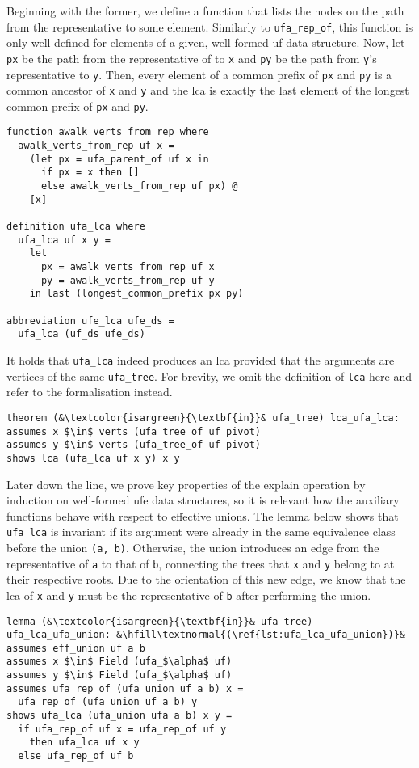 \documentclass[
  sigplan,
  10pt,
  anonymous,
  review,
  ]{acmart}
\newcommand{\opexplain}{explain}
\begin{document}
Beginning with the former, we define a function that lists the nodes on the path from the representative to some element.
Similarly to \lstinline|ufa_rep_of|, this function is only well-defined for elements of a given, well-formed \acrshort{uf} data structure.
Now, let \lstinline|px| be the path from the representative of to \lstinline|x| and \lstinline|py| be the path from \lstinline|y|'s representative to \lstinline|y|.
Then, every element of a common prefix of \lstinline|px| and \lstinline|py| is a common ancestor of \lstinline|x| and \lstinline|y| and
the \acrshort{lca} is exactly the last element of the longest common prefix of \lstinline|px| and \lstinline|py|. 
\begin{lstlisting}
function awalk_verts_from_rep where
  awalk_verts_from_rep uf x =
    (let px = ufa_parent_of uf x in
      if px = x then [] 
      else awalk_verts_from_rep uf px) @ 
    [x]

definition ufa_lca where
  ufa_lca uf x y =
    let
      px = awalk_verts_from_rep uf x
      py = awalk_verts_from_rep uf y
    in last (longest_common_prefix px py)

abbreviation ufe_lca ufe_ds =
  ufa_lca (uf_ds ufe_ds)
\end{lstlisting}
It holds that \lstinline|ufa_lca| indeed produces an \acrshort{lca} provided that the arguments are vertices of the same \lstinline|ufa_tree|.
For brevity, we omit the definition of \lstinline|lca| here and refer to the formalisation instead.
\begin{lstlisting}
theorem (&\textcolor{isargreen}{\textbf{in}}& ufa_tree) lca_ufa_lca:
assumes x $\in$ verts (ufa_tree_of uf pivot)
assumes y $\in$ verts (ufa_tree_of uf pivot)
shows lca (ufa_lca uf x y) x y
\end{lstlisting}
Later down the line, we prove key properties of the \opexplain{} operation by induction on well-formed \acrshort{ufe} data structures, so it is relevant how the auxiliary functions behave with respect to effective unions.
The lemma below shows that \lstinline|ufa_lca| is invariant if its argument were already in the same equivalence class before the union \lstinline|(a, b)|.
Otherwise, the union introduces an edge from the representative of \lstinline|a| to that of \lstinline|b|, connecting the trees that \lstinline|x| and \lstinline|y| belong to at their respective roots.
Due to the orientation of this new edge, we know that the \acrshort{lca} of \lstinline|x| and \lstinline|y| must be the representative of \lstinline|b| after performing the union.
\begin{lstlisting}[caption={[empty]}, label={lst:ufa_lca_ufa_union}]
lemma (&\textcolor{isargreen}{\textbf{in}}& ufa_tree) ufa_lca_ufa_union: &\hfill\textnormal{(\ref{lst:ufa_lca_ufa_union})}&
assumes eff_union uf a b
assumes x $\in$ Field (ufa_$\alpha$ uf) 
assumes y $\in$ Field (ufa_$\alpha$ uf)
assumes ufa_rep_of (ufa_union uf a b) x =
  ufa_rep_of (ufa_union uf a b) y
shows ufa_lca (ufa_union ufa a b) x y =
  if ufa_rep_of uf x = ufa_rep_of uf y
    then ufa_lca uf x y
  else ufa_rep_of uf b
\end{lstlisting}
\end{document}
